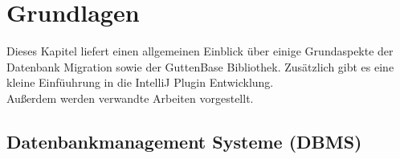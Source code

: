 \chapter{Grundlagen}
Dieses Kapitel liefert einen allgemeinen Einblick über einige Grundaspekte der Datenbank Migration sowie der GuttenBase Bibliothek. Zusätzlich gibt es eine kleine Einfüuhrung in die IntelliJ Plugin Entwicklung.\\
Außerdem werden verwandte Arbeiten vorgestellt. 
\section{Datenbankmanagement Systeme (DBMS)}
%	
	
